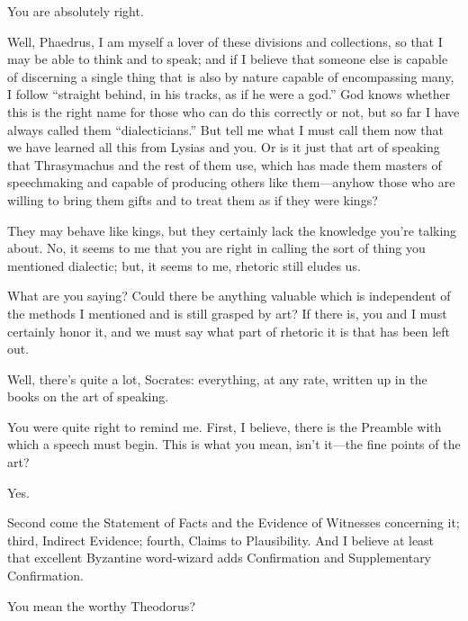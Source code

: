 \sayphaedrus You are absolutely right.

\saysocrates Well, Phaedrus, I am myself a lover of these divisions and
collections, so that I may be able to think and to speak; and if I
believe that someone else is capable of discerning a single thing that
is also by nature capable of encompassing
many, I follow
“straight behind, in his tracks, as if he were a
god.” God knows
whether this is the right name for those who can do this correctly or
not, but so far I have always called them “dialecticians.” But
tell me what I must call them now that we have learned all this from
Lysias and you. Or is it just that art of speaking that Thrasymachus and
the rest of them use, which has made them masters of speechmaking and
capable of producing others like them---anyhow those who are willing to
bring them gifts and to treat them as if they were kings?

\sayphaedrus They may behave like kings, but they certainly lack the
knowledge you're talking about. No, it seems to me that you are right in
calling the sort of thing you mentioned dialectic; but, it seems to me,
rhetoric still eludes us.

\saysocrates What are you saying? Could there be anything valuable which 
is independent of the methods I mentioned and is still grasped
by art? If there is, you and I must certainly honor it, and we must say
what part of rhetoric it is that has been left out.

\sayphaedrus Well, there's quite a lot, Socrates: everything, at any rate,
written up in the books on the art of speaking.

\saysocrates You were quite right to remind me. First, I believe, there is
the Preamble with which a speech must begin. This is what you mean,
isn't it---the fine points of the art?

\sayphaedrus Yes.

\saysocrates Second come the Statement of Facts and the Evidence of
Witnesses concerning it; third, Indirect Evidence; fourth, Claims to
Plausibility. And I believe at least that excellent Byzantine
word-wizard adds Confirmation and Supplementary Confirmation.

\sayphaedrus You mean the worthy
Theodorus?

